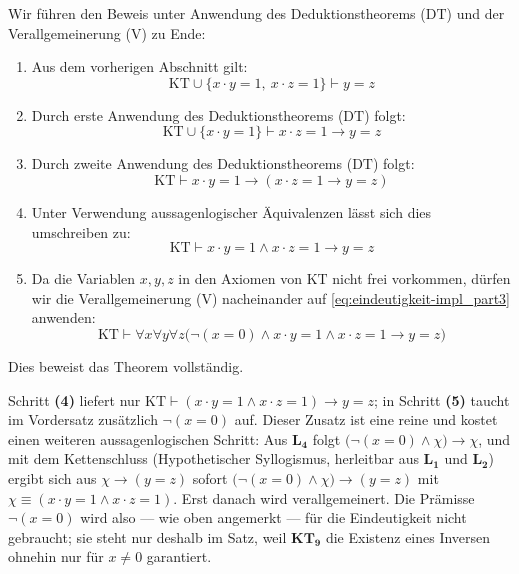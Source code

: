 \begin{math-stroke}
Wir führen den Beweis unter Anwendung des Deduktionstheorems ($\text{DT}$) und der Verallgemeinerung ($\text{V}$) zu Ende:

\begin{short-proof}
\begin{enumerate}[label=\textbf{(\arabic*)}]
    \item Aus dem vorherigen Abschnitt gilt:
    \[ \text{KT} \cup \{x \cdot y = 1, \ x \cdot z = 1\} \vdash y = z \]
    \item Durch erste Anwendung des Deduktionstheorems ($\text{DT}$) folgt:
    \[ \text{KT} \cup \{x \cdot y = 1\} \vdash x \cdot z = 1 \rightarrow y = z \]
    \item Durch zweite Anwendung des Deduktionstheorems ($\text{DT}$) folgt:
    \[ \text{KT} \vdash x \cdot y = 1 \rightarrow (x \cdot z = 1 \rightarrow y = z) \]
    \item Unter Verwendung aussagenlogischer Äquivalenzen lässt sich dies umschreiben zu:
    \begin{equation}\label{eq:eindeutigkeit-impl_part3}
    \text{KT} \vdash x \cdot y = 1 \wedge x \cdot z = 1 \rightarrow y = z
    \end{equation}
    \item Da die Variablen $x, y, z$ in den Axiomen von $\text{KT}$ nicht frei vorkommen, dürfen wir die Verallgemeinerung ($\text{V}$) nacheinander auf \eqref{eq:eindeutigkeit-impl_part3} anwenden:
    \[ \text{KT} \vdash \forall x \forall y \forall z \bigl(\neg(x = 0) \wedge x \cdot y = 1 \wedge x \cdot z = 1 \rightarrow y = z\bigr) \]
\end{enumerate}
Dies beweist das Theorem vollständig.
\end{short-proof}

\begin{explanation-of-steps}[Woher die Prämisse $\neg(x = 0)$ in Schritt \textbf{(5)} kommt]
Schritt \textbf{(4)} liefert nur $\text{KT} \vdash (x \cdot y = 1 \wedge x \cdot z = 1) \rightarrow y = z$; in Schritt \textbf{(5)} taucht im Vordersatz zusätzlich $\neg(x = 0)$ auf. Dieser Zusatz ist eine reine  und kostet einen weiteren aussagenlogischen Schritt: Aus $\mathbf{L_4}$ folgt $\bigl(\neg(x=0) \wedge \chi\bigr) \rightarrow \chi$, und mit dem Kettenschluss (Hypothetischer Syllogismus, herleitbar aus $\mathbf{L_1}$ und $\mathbf{L_2}$) ergibt sich aus $\chi \rightarrow (y = z)$ sofort $\bigl(\neg(x=0) \wedge \chi\bigr) \rightarrow (y = z)$ mit $\chi \equiv (x \cdot y = 1 \wedge x \cdot z = 1)$. Erst danach wird verallgemeinert. Die Prämisse $\neg(x = 0)$ wird also --- wie oben angemerkt --- für die Eindeutigkeit nicht gebraucht; sie steht nur deshalb im Satz, weil $\mathbf{KT_9}$ die Existenz eines Inversen ohnehin nur für $x \neq 0$ garantiert.
\end{explanation-of-steps}
\end{math-stroke}

